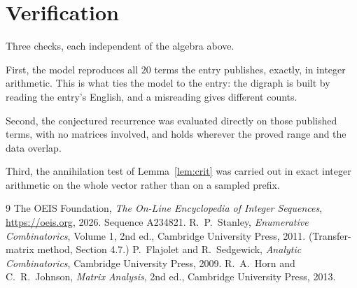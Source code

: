 \documentclass[11pt,a4paper]{article}
\theoremstyle{plain}
\theoremstyle{definition}
\begin{document}
\section{Verification}

Three checks, each independent of the algebra above.

First, the model reproduces all $20$ terms the entry publishes, exactly, in integer
arithmetic. This is what ties the model to the entry: the digraph is built by reading the
entry's English, and a misreading gives different counts.

Second, the conjectured recurrence was evaluated directly on those published terms, with no
matrices involved, and holds wherever the proved range and the data overlap.

Third, the annihilation test of Lemma~\ref{lem:crit} was carried out in exact integer
arithmetic on the whole vector rather than on a sampled prefix.

\begin{thebibliography}{9}
 The OEIS Foundation, \emph{The On-Line Encyclopedia of Integer
Sequences}, \url{https://oeis.org}, 2026. Sequence A234821.
 R.~P.~Stanley, \emph{Enumerative Combinatorics}, Volume 1, 2nd ed.,
Cambridge University Press, 2011. (Transfer-matrix method, Section 4.7.)
 P.~Flajolet and R.~Sedgewick, \emph{Analytic Combinatorics}, Cambridge
University Press, 2009.
 R.~A.~Horn and C.~R.~Johnson, \emph{Matrix Analysis}, 2nd ed., Cambridge
University Press, 2013.
\end{thebibliography}
\end{document}

